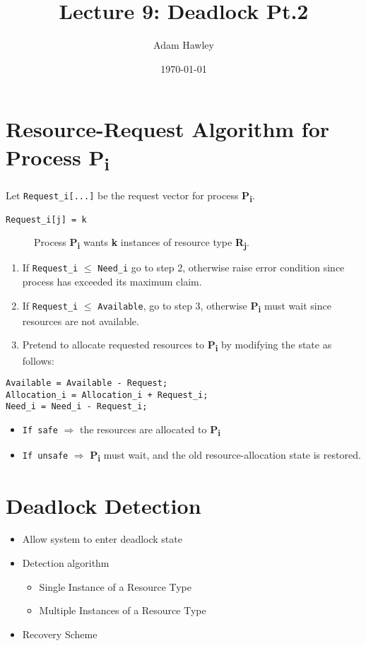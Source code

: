 \documentclass[11pt]{article}
\author{Adam Hawley}
\date{\today}
\title{Lecture 9: Deadlock Pt.2}
\begin{document}
\maketitle
\tableofcontents


\section{Resource-Request Algorithm for Process P\textsubscript{i}}
\label{sec:org81dc827}
Let \texttt{Request\_i[...]} be the request vector for process \textbf{P\textsubscript{i}}.
\begin{description}
\item[{\texttt{Request\_i[j] = k}}] Process \textbf{P\textsubscript{i}} wants \textbf{k} instances of resource type \textbf{R\textsubscript{j}}.
\end{description}


\begin{enumerate}
\item If \texttt{Request\_i} \(\le\) \texttt{Need\_i} go to step 2, otherwise raise error condition since process has exceeded its maximum claim.
\item If \texttt{Request\_i} \(\le\) \texttt{Available}, go to step 3, otherwise \textbf{P\textsubscript{i}} must wait since resources are not available.
\item Pretend to allocate requested resources to \textbf{P\textsubscript{i}} by modifying the state as follows:
\end{enumerate}

\begin{verbatim}
Available = Available - Request;
Allocation_i = Allocation_i + Request_i;
Need_i = Need_i - Request_i;
\end{verbatim}

\begin{itemize}
\item \texttt{If safe} \(\Rightarrow\) the resources are allocated to \textbf{P\textsubscript{i}}
\item \texttt{If unsafe} \(\Rightarrow\) \textbf{P\textsubscript{i}} must wait, and the old resource-allocation state is restored.
\end{itemize}

\section{Deadlock Detection}
\label{sec:org0a58a4c}
\begin{itemize}
\item Allow system to enter deadlock state
\item Detection algorithm
\begin{itemize}
\item Single Instance of a Resource Type
\item Multiple Instances of a Resource Type
\end{itemize}
\item Recovery Scheme
\end{itemize}
\end{document}
